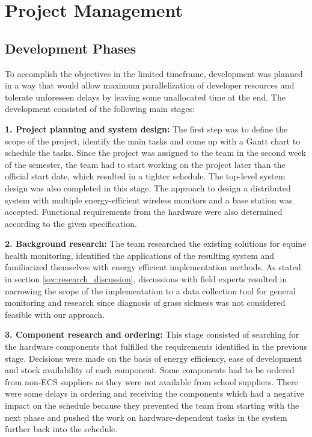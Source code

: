 \chapter{Project Management}

\section{Development Phases}
To accomplish the objectives in the limited timeframe, development was planned in a way that would allow maximum parallelization of developer resources and tolerate unforeseen delays by leaving some unallocated time at the end. The development consisted of the following main stages:

\begin{description}
\item{\bfseries 1. Project planning and system design:}
The first step was to define the scope of the project, identify the main tasks and come up with a Gantt chart to schedule the tasks. Since 	the project was assigned to the team in the second week of the semester, the team had to start working on the project later than the official start date, which resulted in a tighter schedule. The top-level system design was also completed in this stage. The  approach to design a distributed system with multiple energy-efficient wireless monitors and a base station was accepted. Functional requirements from the hardware were also determined according to the given specification.

\item{\bfseries 2. Background research:}
The team researched the existing solutions for equine health monitoring, identified the applications of the resulting system and familiarized themselves with energy efficient implementation methods. As stated in section \ref{sec:research_discussion}, discussions with field experts resulted in narrowing the scope of the implementation to a data collection tool for general monitoring and research since diagnosis of grass sickness was not considered feasible with our approach.

\item{\bfseries 3. Component research and ordering:}
This stage consisted of searching for the hardware components that fulfilled the requirements identified in the previous stage. Decisions were made on the basis of energy efficiency, ease of development and stock availability of each component. Some components had to be ordered from non-ECS suppliers as they were not available from school suppliers. There were some delays in ordering and receiving the components which had a negative impact on the schedule because they prevented the team from starting with the next phase and pushed the work on hardware-dependent tasks in the system further back into the schedule.


\end{description}
